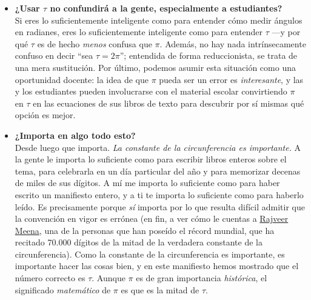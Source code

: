 \begin{itemize}
  \item \textbf{¿Usar $\tau$ no confundirá a la gente, especialmente a estudiantes?} \\  Si eres lo suficientemente inteligente como para entender cómo medir ángulos en radianes, eres lo suficientemente inteligente como para entender $\tau$ ---y por qué $\tau$ es de hecho \emph{menos} confusa que $\pi$. Además, no hay nada intrínsecamente confuso en decir ``sea $\tau = 2\pi$''; entendida de forma reduccionista, se trata de una mera sustitución. Por último, podemos asumir esta situación como una oportunidad docente: la idea de que $\pi$ pueda ser un error es \emph{interesante}, y las y los estudiantes pueden involucrarse con el material escolar convirtiendo $\pi$ en $\tau$ en las ecuaciones de sus libros de texto para descubrir por sí mismas qué opción es mejor.


  \item \textbf{¿Importa en algo todo esto?} \\ Desde luego que importa. \emph{La constante de la circunferencia es importante.} A la gente le importa lo suficiente como para escribir libros enteros sobre el tema, para celebrarla en un día particular del año y para memorizar decenas de miles de sus dígitos. A mí me importa lo suficiente como para haber escrito un manifiesto entero, y a ti te importa lo suficiente como para haberlo leído. Es precisamente porque \emph{sí} importa por lo que resulta difícil admitir que la convención en vigor es errónea (en fin, a ver cómo le cuentas a \href{https://www.guinnessworldrecords.com/world-records/most-pi-places-memorised}{Rajveer Meena}, una de la personas que han poseído el récord mundial, que ha recitado 70.000 dígitos de la mitad de la verdadera constante de la circunferencia).
  Como la constante de la circunferencia es importante, es importante hacer las cosas bien, y en este manifiesto hemos mostrado que el número correcto es $\tau$. Aunque $\pi$ es de gran importancia \emph{histórica}, el significado \emph{matemático} de $\pi$ es que es la mitad de $\tau$.


\end{itemize}
